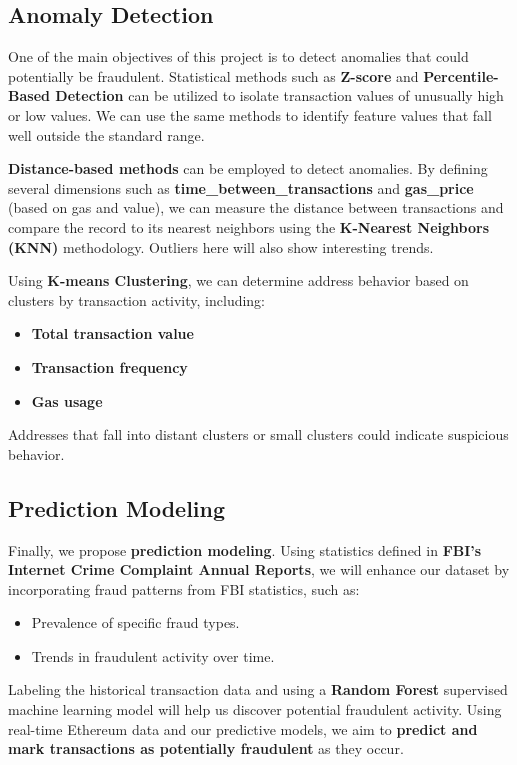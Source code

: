 \documentclass[sigconf]{acmart}
\begin{document}
\subsection{Anomaly Detection}
One of the main objectives of this project is to detect anomalies that could potentially be fraudulent. Statistical methods such as \textbf{Z-score} and \textbf{Percentile-Based Detection} can be utilized to isolate transaction values of unusually high or low values. We can use the same methods to identify feature values that fall well outside the standard range.

\textbf{Distance-based methods} can be employed to detect anomalies. By defining several dimensions such as \textbf{time\_between\_transactions} and \textbf{gas\_price} (based on gas and value), we can measure the distance between transactions and compare the record to its nearest neighbors using the \textbf{K-Nearest Neighbors (KNN)} methodology. Outliers here will also show interesting trends. 

Using \textbf{K-means Clustering}, we can determine address behavior based on clusters by transaction activity, including:
\begin{itemize}
    \item \textbf{Total transaction value}
    \item \textbf{Transaction frequency}
    \item \textbf{Gas usage}
\end{itemize}
Addresses that fall into distant clusters or small clusters could indicate suspicious behavior.

\subsection{Prediction Modeling}
Finally, we propose \textbf{prediction modeling}. Using statistics defined in \textbf{FBI’s Internet Crime Complaint Annual Reports}, we will enhance our dataset by incorporating fraud patterns from FBI statistics, such as:
\begin{itemize}
    \item Prevalence of specific fraud types.
    \item Trends in fraudulent activity over time.
\end{itemize}
Labeling the historical transaction data and using a \textbf{Random Forest} supervised machine learning model will help us discover potential fraudulent activity. Using real-time Ethereum data and our predictive models, we aim to \textbf{predict and mark transactions as potentially fraudulent} as they occur.
\end{document}
